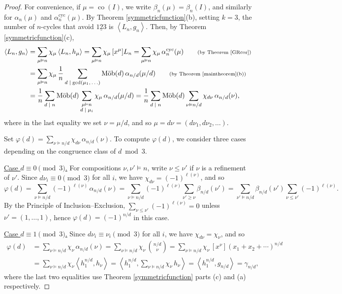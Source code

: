 \documentclass[12pt]{article}
\newcommand{\since}[1]{\tag*{\scriptsize{(#1)}}}
\newcommand{\alphacyc}{\alpha^{\text{cyc}}}
\DeclareMathOperator{\mob}{M\ddot{o}b}
\DeclareMathOperator{\co}{co}
\newcommand{\gam}{\gamma}
\newcommand{\ee}{\chi}
\theoremstyle{definition}
\begin{document}
\begin{proof}
For convenience, if $\mu = \co(I)$, we write $\beta_n(\mu) = \beta_n(I)$, and similarly for $\alpha_n(\mu)$ and $\alphacyc_n(\mu)$. By Theorem \ref{symmetricfunction}(b), setting $k = 3$, the number of $n$-cycles that avoid $\underline{123}$ is $\left\langle L_n, g_n \right\rangle$. Then, 
by Theorem \ref{symmetricfunction}(c),
\begin{align}
\left\langle L_n, g_n \right\rangle &= \sum_{\mu\vDash n} \ee_\mu \left\langle L_n, h_\mu \right\rangle= \sum_{\mu\vDash n} \ee_\mu \, [x^\mu]L_n = \sum_{\mu\vDash n} \ee_\mu\, \alphacyc_n(\mu) \since{by Theorem \ref{GRcor}} \\
&= \sum_{\mu\vDash n} \ee_\mu \,\frac{1}{n} \sum_{\text{$d \mid \gcd(\mu_1,\ldots)$}} \mob(d)\, \alpha_{n/d}(\mu/d) \since{by Theorem \ref{maintheorem}(b)} \\
&= \frac{1}{n} \sum_{\text{$d \mid n$}} \mob(d) \sum_{\substack{\mu \vDash n \\ \text{$d \mid \mu_i$}}} \ee_\mu\,\alpha_{n/d}(\mu/d)
= \frac{1}{n} \sum_{\text{$d \mid n$}} \mob(d) \sum_{\nu \vDash n/d} \ee_{d\nu}\,\alpha_{n/d}(\nu),\label{eq:star}
\end{align}
where in the last equality we set $\nu = \mu/d$, and so $\mu = d\nu = (d\nu_1, d\nu_2, \ldots)$.

Set $\varphi(d) = \sum_{\nu \vDash n/d} \ee_{d\nu}\,\alpha_{n/d}(\nu)$. To compute $\varphi(d)$, we consider three cases depending on the congruence class of $d\bmod3$.

\noindent\underline{Case $d \equiv 0 \pmod{3}$.} For compositions $\nu, \nu' \vDash n$, write $\nu \le \nu'$ if $\nu$ is a refinement of $\nu'$. Since $d\nu_i \equiv 0 \pmod{3}$ for all $i$, we have $\ee_{d\nu} = (-1)^{\ell(\nu)}$, and so
$$
\varphi(d) = \sum_{\nu \vDash n/d} (-1)^{\ell(\nu)}\,\alpha_{n/d}(\nu) = \sum_{\nu \vDash n/d} (-1)^{\ell(\nu)} \sum_{\nu'\ge\nu} \beta_{n/d}(\nu') = \sum_{\nu' \vDash n/d} \beta_{n/d}(\nu') \sum_{\nu \le \nu'} (-1)^{\ell(\nu)}.
$$
By the Principle of Inclusion--Exclusion, $\sum_{\nu \le \nu'} (-1)^{\ell(\nu)} = 0$ unless $\nu' = (1, \ldots, 1)$, hence $\varphi(d) = (-1)^{n/d}$ in this case.

\noindent\underline{Case $d \equiv 1 \pmod{3}$.} Since $d\nu_i \equiv \nu_i \pmod{3}$ for all $i$, we have $\ee_{d\nu} = \ee_\nu$, and so
\begin{align*}
\varphi(d) &= \sum_{\nu \vDash n/d} \ee_\nu\,\alpha_{n/d}(\nu) = \sum_{\nu \vDash n/d} \ee_\nu\,\binom{n/d}{\nu} = \sum_{\nu \vDash n/d} \ee_\nu\,[x^\nu]{(x_1 + x_2 + \cdots)}^{n/d} \\
&= \sum_{\nu \vDash n/d} \ee_\nu \left\langle h_1^{n/d}, h_\nu \right\rangle = \left\langle h_1^{n/d}, \sum_{\nu \vDash n/d} \ee_\nu \,h_\nu \right\rangle = \left\langle h_1^{n/d}, g_{n/d} \right\rangle=\gam_{n/d},
\end{align*}
where the last two equalities use Theorem \ref{symmetricfunction} parts (c) and (a) respectively.


\end{proof}
\end{document}
